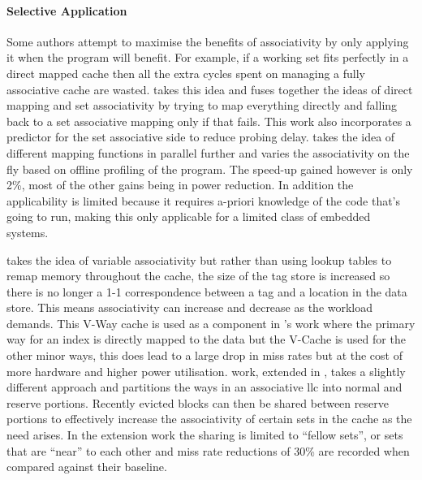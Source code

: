 \paragraph{Selective Application}

Some authors attempt to maximise the benefits of associativity by only applying it when the program will benefit. For example, if a working set fits perfectly in a direct mapped cache then all the extra cycles spent on managing a fully associative cache are wasted. \citet{batsonReactiveassociativeCaches2001} takes this idea and fuses together the ideas of direct mapping and set associativity by trying to map everything directly and falling back to a set associative mapping only if that fails. This work also incorporates a predictor for the set associative side to reduce probing delay. \citet{alyVariablewaySetAssociative2003} takes the idea of different mapping functions in parallel further and varies the associativity on the fly based on offline profiling of the program. The speed-up gained however is only 2\%, most of the other gains being in power reduction. In addition the applicability is limited because it requires a-priori knowledge of the code that's going to run, making this only applicable for a limited class of embedded systems. 

\citet{qureshiVWayCacheDemandbased2005} takes the idea of variable associativity but rather than using lookup tables to remap memory throughout the cache, the size of the tag store is increased so there is no longer a 1-1 correspondence between a tag and a location in the data store. This means associativity can increase and decrease as the workload demands. This V-Way cache is used as a component in \citet{deepikaHybridwayCacheMobile2011}'s work where the primary way for an index is directly mapped to the data but the V-Cache is used for the other minor ways, this does lead to a large drop in miss rates but at the cost of more hardware and higher power utilisation. \citet{dasVictimRetentionReducing2014} work, extended in \citet{dasDynamicAssociativityManagement2013}, takes a slightly different approach and partitions the ways in an associative \gls{llc} into normal and reserve portions. Recently evicted blocks can then be shared between reserve portions to effectively increase the associativity of certain sets in the cache as the need arises. In the extension work \cite{dasDynamicAssociativityManagement2013} the sharing is limited to ``fellow sets'', or sets that are ``near'' to each other and miss rate reductions of 30\% are recorded when compared against their baseline.

